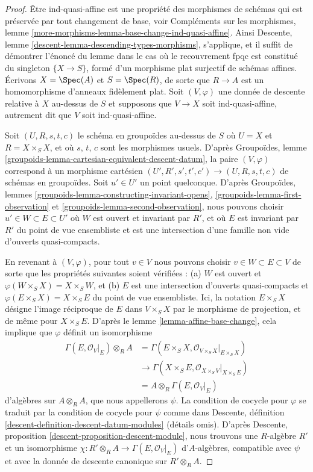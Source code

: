 \begin{proof}
Être ind-quasi-affine est une propriété des morphismes de schémas
qui est préservée par tout changement de base, voir
Compléments sur les morphismes, lemme
\ref{more-morphisms-lemma-base-change-ind-quasi-affine}.
Ainsi Descente, lemme \ref{descent-lemma-descending-types-morphisms}, s'applique,
et il suffit de démontrer l'énoncé du lemme
dans le cas où le recouvrement fpqc est constitué du singleton
$\{X \to S\}$, formé d'un morphisme plat surjectif de schémas affines.
Écrivons $X = \Spec(A)$ et $S = \Spec(R)$, de sorte
que $R \to A$ est un homomorphisme d'anneaux fidèlement plat.
Soit $(V, \varphi)$ une donnée de descente relative à $X$ au-dessus de $S$
et supposons que $V \to X$ soit ind-quasi-affine, autrement dit que
$V$ soit ind-quasi-affine.

\medskip\noindent
Soit $(U, R, s, t, c)$ le schéma en groupoïdes au-dessus de $S$ où
$U = X$ et $R = X \times_S X$, et où $s$, $t$, $c$ sont les morphismes usuels.
D'après Groupoïdes, lemme \ref{groupoids-lemma-cartesian-equivalent-descent-datum},
la paire $(V, \varphi)$ correspond à un morphisme cartésien
$(U', R', s', t', c') \to (U, R, s, t, c)$ de schémas en groupoïdes.
Soit $u' \in U'$ un point quelconque. D'après
Groupoïdes, lemmes \ref{groupoids-lemma-constructing-invariant-opens},
\ref{groupoids-lemma-first-observation} et
\ref{groupoids-lemma-second-observation},
nous pouvons choisir $u' \in W \subset E \subset U'$
où $W$ est ouvert et invariant par $R'$, et où
$E$ est invariant par $R'$ du point de vue ensembliste et
est une intersection d'une famille non vide d'ouverts quasi-compacts.

\medskip\noindent
En revenant à $(V, \varphi)$, pour tout $v \in V$ nous pouvons choisir
$v \in W \subset E \subset V$ de sorte que les propriétés suivantes soient vérifiées :
(a) $W$ est ouvert et $\varphi(W \times_S X) = X \times_S W$, et
(b) $E$ est une intersection d'ouverts quasi-compacts et
$\varphi(E \times_S X) = X \times_S E$ du point de vue ensembliste.
Ici, la notation $E \times_S X$ désigne
l'image réciproque de $E$ dans $V \times_S X$ par le morphisme de projection, et
de même pour $X \times_S E$. D'après le lemme \ref{lemma-affine-base-change},
cela implique que $\varphi$ définit un isomorphisme
\begin{align*}
\Gamma(E, \mathcal{O}_V|_E) \otimes_R A
& =
\Gamma(E \times_S X, \mathcal{O}_{V \times_S X}|_{E \times_S X}) \\
& \to
\Gamma(X \times_S E, \mathcal{O}_{X \times_S V}|_{X \times_S E}) \\
& =
A \otimes_R \Gamma(E, \mathcal{O}_V|_E)
\end{align*}
d'algèbres sur $A \otimes_R A$, que nous appellerons $\psi$.
La condition de cocycle pour $\varphi$
se traduit par la condition de cocycle pour $\psi$ comme dans
Descente, définition \ref{descent-definition-descent-datum-modules}
(détails omis). D'après Descente, proposition
\ref{descent-proposition-descent-module},
nous trouvons une $R$-algèbre $R'$ et un isomorphisme
$\chi : R' \otimes_R A \to \Gamma(E, \mathcal{O}_V|_E)$
d'$A$-algèbres, compatible avec $\psi$ et avec la
donnée de descente canonique sur $R' \otimes_R A$.


\end{proof}
